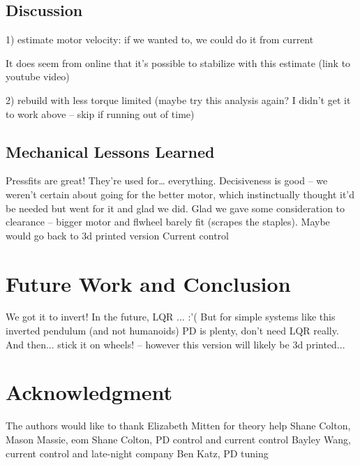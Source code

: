 \documentclass[conference]{IEEEtran}
\begin{document}
\subsection{Discussion}

1) estimate motor velocity: if we wanted to, we could do it from current

It does seem from online that it's possible to stabilize with this estimate
(link to youtube video)

2) rebuild with less torque limited (maybe try this analysis again? I didn't get
it to work above -- skip if running out of time)




\subsection{Mechanical Lessons Learned}

Pressfits are great! They’re used for… everything.
Decisiveness is good – we weren’t certain about going for the better motor, which instinctually thought it’d be needed but went for it and glad we did.
Glad we gave some consideration to clearance – bigger motor and flwheel barely fit (scrapes the staples).
Maybe would go back to 3d printed version
Current control


\section{Future Work and Conclusion}

We got it to invert!
In the future, LQR ... :'( 
But for simple systems like this inverted pendulum (and not humanoids) PD is
plenty, don't need LQR really.
And then... stick it on wheels! -- however this version will likely be 3d
printed...
\section*{Acknowledgment}

The authors would like to thank Elizabeth Mitten for theory help
Shane Colton, Mason Massie, eom
Shane Colton, PD control and current control
Bayley Wang, current control and late-night company
Ben Katz, PD tuning



\end{document}
